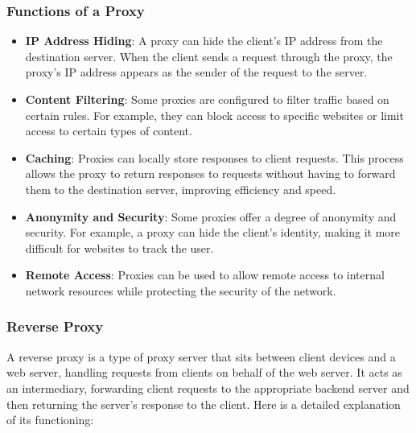 \subsubsection{Functions of a Proxy}

\begin{itemize}
    \item \textbf{IP Address Hiding}: A proxy can hide the client's IP address from the destination server. When the client sends a request through the proxy, the proxy's IP address appears as the sender of the request to the server.
    \item \textbf{Content Filtering}: Some proxies are configured to filter traffic based on certain rules. For example, they can block access to specific websites or limit access to certain types of content.
    \item \textbf{Caching}: Proxies can locally store responses to client requests. This process allows the proxy to return responses to requests without having to forward them to the destination server, improving efficiency and speed.
    \item \textbf{Anonymity and Security}: Some proxies offer a degree of anonymity and security. For example, a proxy can hide the client's identity, making it more difficult for websites to track the user.
    \item \textbf{Remote Access}: Proxies can be used to allow remote access to internal network resources while protecting the security of the network.
\end{itemize}

\subsubsection{Reverse Proxy}
A reverse proxy is a type of proxy server that sits between client devices and a web server, handling requests from clients on behalf of the web server. It acts as an intermediary, forwarding client requests to the appropriate backend server and then returning the server's response to the client. Here is a detailed explanation of its functioning:


